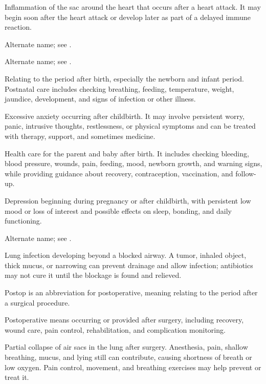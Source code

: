  Inflammation of the sac around the heart that occurs after a heart attack. It may begin soon after the heart attack or develop later as part of a delayed immune reaction.

 Alternate name; see .

 Alternate name; see .

 Relating to the period after birth, especially the newborn and infant period. Postnatal care includes checking breathing, feeding, temperature, weight, jaundice, development, and signs of infection or other illness.

 Excessive anxiety occurring after childbirth. It may involve persistent worry, panic, intrusive thoughts, restlessness, or physical symptoms and can be treated with therapy, support, and sometimes medicine.

 Health care for the parent and baby after birth. It includes checking bleeding, blood pressure, wounds, pain, feeding, mood, newborn growth, and warning signs, while providing guidance about recovery, contraception, vaccination, and follow-up.

 Depression beginning during pregnancy or after childbirth, with persistent low mood or loss of interest and possible effects on sleep, bonding, and daily functioning.

 Alternate name; see .

 Lung infection developing beyond a blocked airway. A tumor, inhaled object, thick mucus, or narrowing can prevent drainage and allow infection; antibiotics may not cure it until the blockage is found and relieved.

 Postop is an abbreviation for postoperative, meaning relating to the period after a surgical procedure.

 Postoperative means occurring or provided after surgery, including recovery, wound care, pain control, rehabilitation, and complication monitoring.

 Partial collapse of air sacs in the lung after surgery. Anesthesia, pain, shallow breathing, mucus, and lying still can contribute, causing shortness of breath or low oxygen. Pain control, movement, and breathing exercises may help prevent or treat it.

